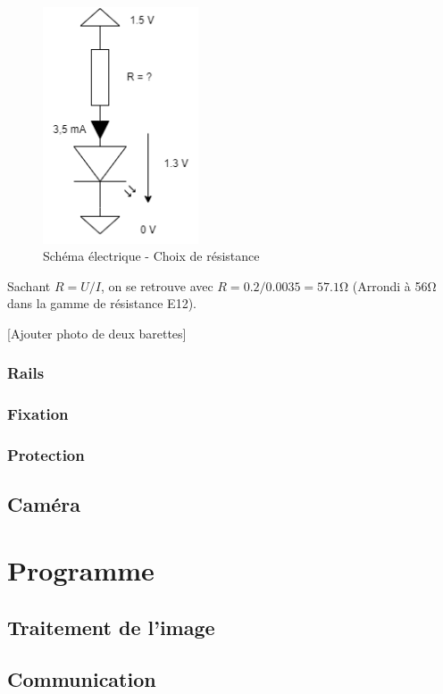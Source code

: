 \begin{figure}[H]
    \centering
    \includegraphics[height=7cm]{assets/figures/schema_led_res.png}
    \caption{Schéma électrique - Choix de résistance}
\end{figure}

Sachant \(R = U / I\), on se retrouve avec \(R = 0.2 / 0.0035 = 57.1 \si{\ohm} \) (Arrondi à 56\si{\ohm} dans la gamme de résistance E12).

    [Ajouter photo de deux barettes]

\subsubsection{Rails}
\subsubsection{Fixation}
\subsubsection{Protection}
\subsection{Caméra}

\section{Programme}
\subsection{Traitement de l'image}
\subsection{Communication}
